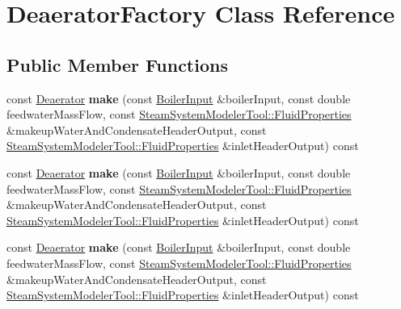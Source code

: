 \hypertarget{class_deaerator_factory}{}\section{Deaerator\+Factory Class Reference}
\label{class_deaerator_factory}
\subsection*{Public Member Functions}
\begin{DoxyCompactItemize}
\item 
\mbox{\label{class_deaerator_factory_af80a22323f51e8fa7ef89a4e778dae6d}} 
const \hyperlink{class_deaerator}{Deaerator} {\bfseries make} (const \hyperlink{class_boiler_input}{Boiler\+Input} \&boiler\+Input, const double feedwater\+Mass\+Flow, const \hyperlink{struct_steam_system_modeler_tool_1_1_fluid_properties}{Steam\+System\+Modeler\+Tool\+::\+Fluid\+Properties} \&makeup\+Water\+And\+Condensate\+Header\+Output, const \hyperlink{struct_steam_system_modeler_tool_1_1_fluid_properties}{Steam\+System\+Modeler\+Tool\+::\+Fluid\+Properties} \&inlet\+Header\+Output) const
\item 
\mbox{\label{class_deaerator_factory_af80a22323f51e8fa7ef89a4e778dae6d}} 
const \hyperlink{class_deaerator}{Deaerator} {\bfseries make} (const \hyperlink{class_boiler_input}{Boiler\+Input} \&boiler\+Input, const double feedwater\+Mass\+Flow, const \hyperlink{struct_steam_system_modeler_tool_1_1_fluid_properties}{Steam\+System\+Modeler\+Tool\+::\+Fluid\+Properties} \&makeup\+Water\+And\+Condensate\+Header\+Output, const \hyperlink{struct_steam_system_modeler_tool_1_1_fluid_properties}{Steam\+System\+Modeler\+Tool\+::\+Fluid\+Properties} \&inlet\+Header\+Output) const
\item 
\mbox{\label{class_deaerator_factory_af80a22323f51e8fa7ef89a4e778dae6d}} 
const \hyperlink{class_deaerator}{Deaerator} {\bfseries make} (const \hyperlink{class_boiler_input}{Boiler\+Input} \&boiler\+Input, const double feedwater\+Mass\+Flow, const \hyperlink{struct_steam_system_modeler_tool_1_1_fluid_properties}{Steam\+System\+Modeler\+Tool\+::\+Fluid\+Properties} \&makeup\+Water\+And\+Condensate\+Header\+Output, const \hyperlink{struct_steam_system_modeler_tool_1_1_fluid_properties}{Steam\+System\+Modeler\+Tool\+::\+Fluid\+Properties} \&inlet\+Header\+Output) const
\end{DoxyCompactItemize}


